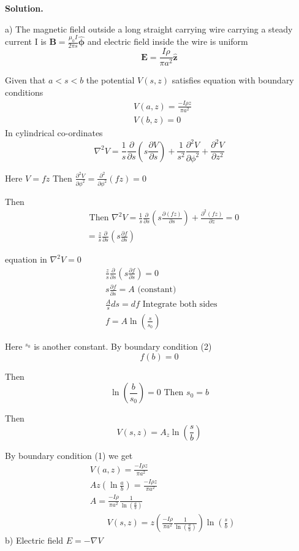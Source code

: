 \documentclass[12pt, a4paper, oneside]{report}
\newenvironment{solution}{
  \par\medskip\noindent
  \textbf{Solution.}\quad\itshape
  \par\noindent\makebox[\linewidth]{\rule{\textwidth}{0.4pt}}
}{
  \par\noindent\makebox[\linewidth]{\rule{\textwidth}{0.4pt}}
  \par\medskip
}
\begin{document}
\begin{solution}
    a) The magnetic field outside a long straight carrying wire carrying a steady current I is $\mathbf{B}=\frac{\mu_0 I}{2 \pi s} \hat{\boldsymbol{\phi}}$ and electric field inside the wire is uniform
$$
\mathbf{E}=\frac{I \rho}{\pi a^2} \hat{\mathbf{z}}
$$

Given that $a<s<b$ the potential $V(s, z)$ satisfies equation with boundary conditions
$$
\begin{aligned}
& V(a, z)=\frac{-I \rho z}{\pi a^2} \\
& V(b, z)=0
\end{aligned}
$$
In cylindrical co-ordinates
$$
\nabla^2 V=\frac{1}{s} \frac{\partial}{\partial s}\left(s \frac{\partial V}{\partial s}\right)+\frac{1}{s^2} \frac{\partial^2 V}{\partial \phi^2}+\frac{\partial^2 V}{\partial z^2}
$$

Here $V=f z$
Then $\frac{\partial^2 V}{\partial \phi^2}=\frac{\partial^2}{\partial \phi^2}(f z)=0$

Then
$$
\begin{aligned}
& \text { Then } \nabla^2 V=\frac{1}{s} \frac{\partial}{\partial s}\left(s \frac{\partial(f z)}{\partial s}\right)+\frac{\partial^2(f z)}{\partial z}=0 \\
& =\frac{z}{s} \frac{\partial}{\partial s}\left(s \frac{\partial f}{\partial s}\right)
\end{aligned}
$$

equation in $\nabla^2 V=0$
$$
\begin{aligned}
& \frac{z}{s} \frac{\partial}{\partial s}\left(s \frac{\partial f}{\partial s}\right)=0 \\
& s \frac{\partial f}{\partial s}=A \text { (constant) } \\
& \frac{A}{s} d s=d f \text { Integrate both sides } \\
& f=A \ln \left(\frac{s}{s_0}\right)
\end{aligned}
$$

Here ${ }^{s_0}$ is another constant.
By boundary condition (2)
$$
f(b)=0
$$

Then
$$
\ln \left(\frac{b}{s_0}\right)=0 \text { Then } s_0=b
$$

Then
$$
V(s, z)=A_z \ln \left(\frac{s}{b}\right)
$$


By boundary condition (1) we get
$$
\begin{aligned}
& V(a, z)=\frac{-I \rho z}{\pi a^2} \\
& A z\left(\ln \frac{a}{b}\right)=\frac{-I \rho z}{\pi a^2} \\
& A=\frac{-I \rho}{\pi a^2} \frac{1}{\ln \left(\frac{a}{b}\right)} \\
& \qquad V(s, z)=z\left(\frac{-I \rho}{\pi a^2} \frac{1}{\ln \left(\frac{a}{b}\right)}\right) \ln \left(\frac{s}{b}\right)
\end{aligned}
$$
b) Electric field $E=-\nabla V$


\end{solution}
\end{document}

